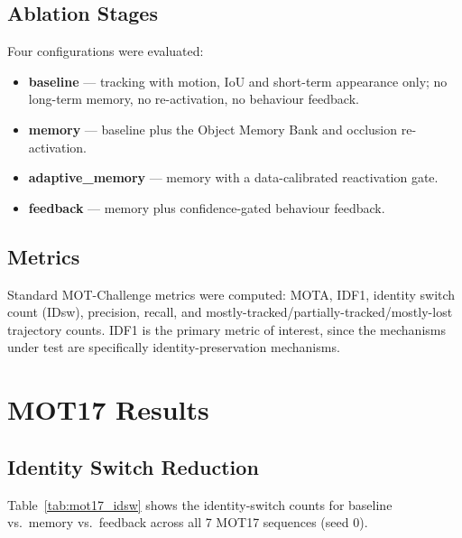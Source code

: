 \documentclass[11pt,a4paper]{article}
\begin{document}
\subsection{Ablation Stages}
Four configurations were evaluated:
\begin{itemize}[leftmargin=2em]
    \item \textbf{baseline} --- tracking with motion, IoU and short-term appearance only; no long-term memory, no re-activation, no behaviour feedback.
    \item \textbf{memory} --- baseline plus the Object Memory Bank and occlusion re-activation.
    \item \textbf{adaptive\_memory} --- memory with a data-calibrated reactivation gate.
    \item \textbf{feedback} --- memory plus confidence-gated behaviour feedback.
\end{itemize}

\subsection{Metrics}
Standard MOT-Challenge metrics were computed: MOTA, IDF1, identity switch count (IDsw), precision, recall, and mostly-tracked/partially-tracked/mostly-lost trajectory counts. IDF1 is the primary metric of interest, since the mechanisms under test are specifically identity-preservation mechanisms.

\section{MOT17 Results}

\subsection{Identity Switch Reduction}
Table~\ref{tab:mot17_idsw} shows the identity-switch counts for baseline vs.\ memory vs.\ feedback across all 7 MOT17 sequences (seed 0).
\end{document}
